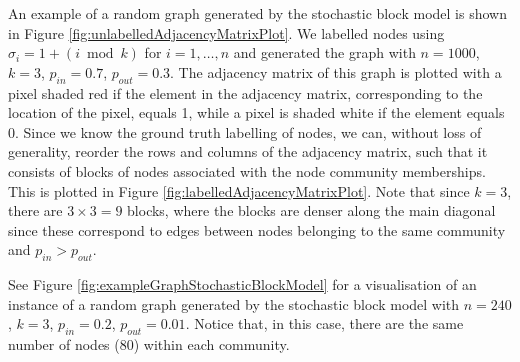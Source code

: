 \documentclass[12pt]{article}
\numberwithin{equation}{section}
\begin{document}
An example of a random graph generated by the stochastic block model is shown in Figure \ref{fig:unlabelledAdjacencyMatrixPlot}. We labelled nodes using $\sigma_{i} = 1 + (i \bmod{k})$ for $i = 1,\dots,n$ and generated the graph with $n = 1000$, $k = 3$, $p_{in} = 0.7$, $p_{out} = 0.3$. The adjacency matrix of this graph is plotted with a pixel shaded red if the element in the adjacency matrix, corresponding to the location of the pixel, equals 1, while a pixel is shaded white if the element equals 0. Since we know the ground truth labelling of nodes, we can, without loss of generality, reorder the rows and columns of the adjacency matrix, such that it consists of blocks of nodes associated with the node community memberships. This is plotted in Figure \ref{fig:labelledAdjacencyMatrixPlot}. Note that since $k = 3$, there are $3 \times 3 = 9$ blocks, where the blocks are denser along the main diagonal since these correspond to edges between nodes belonging to the same community and $p_{in} > p_{out}$.


See Figure \ref{fig:exampleGraphStochasticBlockModel} for a visualisation of an instance of a random graph generated by the stochastic block model with $n = 240$, $k = 3$, $p_{in} = 0.2$, $p_{out} = 0.01$. Notice that, in this case, there are the same number of nodes (80) within each community.
\end{document}

